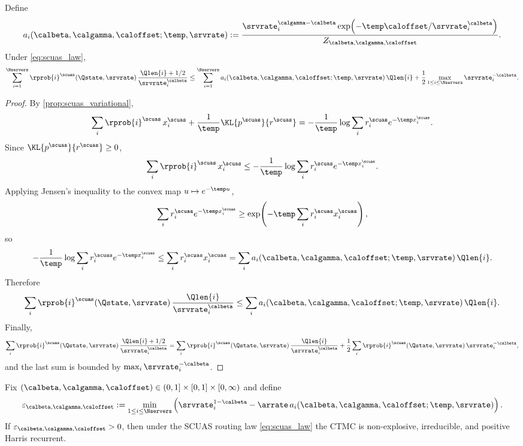 \begin{lemma}
\label{lem:scuas_arrival}
Define
\begin{equation}
\label{eq:scuas_ai}
a_i(\calbeta,\calgamma,\caloffset;\temp,\srvrate)
:=
\frac{\srvrate_i^{\calgamma-\calbeta}
\exp\!\left(-\temp \caloffset/\srvrate_i^{\calbeta}\right)}
{Z_{\calbeta,\calgamma,\caloffset}}.
\end{equation}
Under \eqref{eq:scuas_law},
\begin{equation}
\label{eq:scuas_arrival_bound}
\sum_{i=1}^{\Nservers} \rprob{i}^{\scuas}(\Qstate,\srvrate)\,
\frac{\Qlen{i}+1/2}{\srvrate_i^{\calbeta}}
\le
\sum_{i=1}^{\Nservers} a_i(\calbeta,\calgamma,\caloffset;\temp,\srvrate)\,\Qlen{i}
+ \frac12 \max_{1 \le i \le \Nservers} \srvrate_i^{-\calbeta}.
\end{equation}
\end{lemma}

\begin{proof}
By \cref{prop:scuas_variational},
\[
\sum_i \rprob{i}^{\scuas}\,x_i^{\scuas}
+ \frac{1}{\temp}\KL{p^{\scuas}}{r^{\scuas}}
=
-\frac{1}{\temp}\log\sum_i r_i^{\scuas} e^{-\temp x_i^{\scuas}}.
\]
Since $\KL{p^{\scuas}}{r^{\scuas}}\ge 0$,
\[
\sum_i \rprob{i}^{\scuas}\,x_i^{\scuas}
\le
-\frac{1}{\temp}\log\sum_i r_i^{\scuas} e^{-\temp x_i^{\scuas}}.
\]
Applying Jensen's inequality to the convex map $u \mapsto e^{-\temp u}$,
\[
\sum_i r_i^{\scuas} e^{-\temp x_i^{\scuas}}
\ge
\exp\!\left(-\temp \sum_i r_i^{\scuas} x_i^{\scuas}\right),
\]
so
\[
-\frac{1}{\temp}\log\sum_i r_i^{\scuas} e^{-\temp x_i^{\scuas}}
\le
\sum_i r_i^{\scuas} x_i^{\scuas}
=
\sum_i a_i(\calbeta,\calgamma,\caloffset;\temp,\srvrate)\,\Qlen{i}.
\]
Therefore
\[
\sum_i \rprob{i}^{\scuas}(\Qstate,\srvrate)\,\frac{\Qlen{i}}{\srvrate_i^{\calbeta}}
\le
\sum_i a_i(\calbeta,\calgamma,\caloffset;\temp,\srvrate)\,\Qlen{i}.
\]
Finally,
\[
\sum_i \rprob{i}^{\scuas}(\Qstate,\srvrate)\,\frac{\Qlen{i}+1/2}{\srvrate_i^{\calbeta}}
=
\sum_i \rprob{i}^{\scuas}(\Qstate,\srvrate)\,\frac{\Qlen{i}}{\srvrate_i^{\calbeta}}
+ \frac12 \sum_i \rprob{i}^{\scuas}(\Qstate,\srvrate)\,\srvrate_i^{-\calbeta},
\]
and the last sum is bounded by $\max_i \srvrate_i^{-\calbeta}$.
\end{proof}

\begin{theorem}
\label{thm:scuas}
Fix $(\calbeta,\calgamma,\caloffset)\in(0,1]\times[0,1]\times[0,\infty)$ and define
\begin{equation}
\label{eq:scuas_epsilon}
\varepsilon_{\calbeta,\calgamma,\caloffset}
:=
\min_{1 \le i \le \Nservers}
\left(
\srvrate_i^{1-\calbeta}
- \arrate \, a_i(\calbeta,\calgamma,\caloffset;\temp,\srvrate)
\right).
\end{equation}
If $\varepsilon_{\calbeta,\calgamma,\caloffset} > 0$, then under the SCUAS routing law \eqref{eq:scuas_law} the CTMC is non-explosive, irreducible, and positive Harris recurrent.
\end{theorem}

